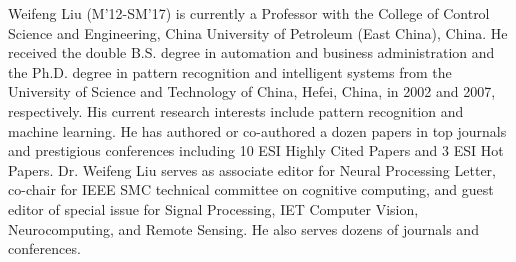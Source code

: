 \documentclass[10pt,journal,compsoc]{IEEEtran}
\begin{document}
\begin{IEEEbiography}{Weifeng Liu}
 (M’12-SM’17) is currently a Professor with the College of Control Science and Engineering, China University of Petroleum (East China), China. He received the double B.S. degree in automation and business administration and the Ph.D. degree in pattern recognition and intelligent systems from the University of Science and Technology of China, Hefei, China, in 2002 and 2007, respectively. His current research interests include pattern recognition and machine learning. He has authored or co-authored a dozen papers in top journals and prestigious conferences including 10 ESI Highly Cited Papers and 3 ESI Hot Papers. Dr. Weifeng Liu serves as associate editor for Neural Processing Letter, co-chair for IEEE SMC technical committee on cognitive computing, and guest editor of special issue for Signal Processing, IET Computer Vision, Neurocomputing, and Remote Sensing. He also serves dozens of journals and conferences.
\end{IEEEbiography}








\end{document}
